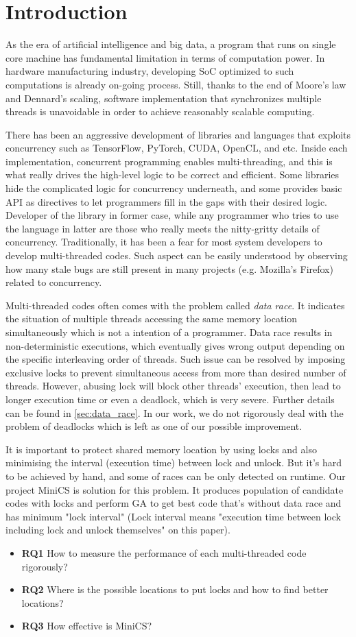 \section{Introduction}
\label{sec:intro}

As the era of artificial intelligence and big data, a program that runs on single core machine has fundamental limitation in terms of computation power. In hardware manufacturing industry, developing SoC optimized to such computations is already on-going process. Still, thanks to the end of Moore's law and Dennard's scaling, software implementation that synchronizes multiple threads is unavoidable in order to achieve reasonably scalable computing.

There has been an aggressive development of libraries and languages that exploits concurrency such as TensorFlow, PyTorch, CUDA, OpenCL, and etc. Inside each implementation, concurrent programming enables multi-threading, and this is what really drives the high-level logic to be correct and efficient. Some libraries hide the complicated logic for concurrency underneath, and some provides basic API as directives to let programmers fill in the gaps with their desired logic. Developer of the library in former case, while any programmer who tries to use the language in latter are those who really meets the nitty-gritty details of concurrency. Traditionally, it has been a fear for most system developers to develop multi-threaded codes. Such aspect can be easily understood by observing how many stale bugs are still present in many projects (e.g. Mozilla's Firefox) related to concurrency.

Multi-threaded codes often comes with the problem called \textit{data race}. It indicates the situation of multiple threads accessing the same memory location simultaneously which is not a intention of a programmer. Data race results in non-deterministic executions, which eventually gives wrong output depending on the specific interleaving order of threads. Such issue can be resolved by imposing exclusive locks to prevent simultaneous access from more than desired number of threads. However, abusing lock will block other threads' execution, then lead to longer execution time or even a deadlock, which is very severe. Further details can be found in \ref{sec:data_race}. In our work, we do not rigorously deal with the problem of deadlocks which is left as one of our possible improvement.

It is important to protect shared memory location by using locks and also minimising the interval (execution time) between lock and unlock. But it's hard to be achieved by hand, and some of races can be only detected on runtime.
Our project MiniCS is solution for this problem. It produces population of candidate codes with locks and perform GA to get best code that's without data race and has minimum "lock interval" (Lock interval means "execution time between lock including lock and unlock themselves" on this paper). 

\begin{itemize}
	\setlength\itemsep{0.5em}
	\item[] \textbf{RQ1} How to measure the performance of each multi-threaded code rigorously?
	\item[] \textbf{RQ2} Where is the possible locations to put locks and how to find better locations?
	\item[] \textbf{RQ3} How effective is MiniCS?
\end{itemize}